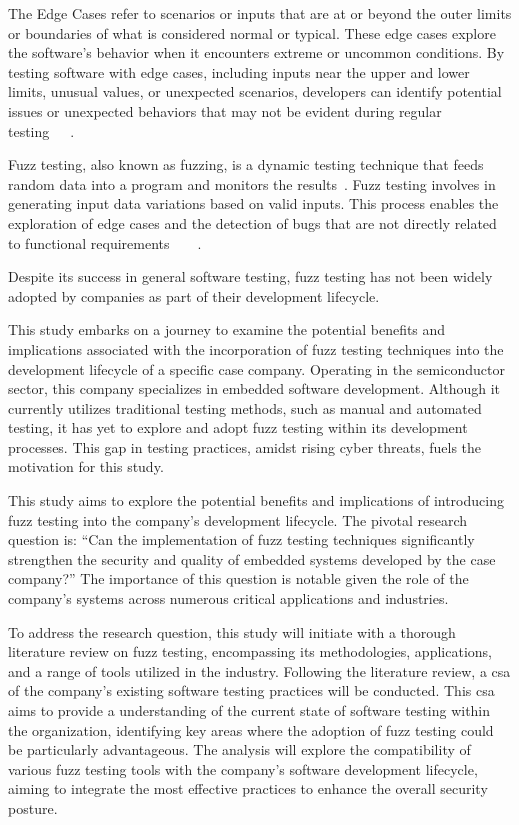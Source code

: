 The \gls{Edge Cases} refer to scenarios or inputs that are at or beyond the outer limits or boundaries
of what is considered normal or typical. These edge cases explore the software's behavior when
it encounters extreme or uncommon conditions. By testing software with edge cases, including
inputs near the upper and lower limits, unusual values, or unexpected scenarios, developers
can identify potential issues or unexpected behaviors that may not be evident
during regular testing~\cite{deng2023large}~\cite{cunningham2019software}~\cite{koopman2016challenges}.

Fuzz testing, also known as fuzzing, is a dynamic testing technique that feeds random data into a
program and monitors the results~\cite{felderer2016security}\cite{yun2022fuzzing}.
Fuzz testing involves in generating input data variations based on valid inputs.
This process enables the exploration of edge cases and the detection of bugs that are not directly
related to
functional requirements~\cite{eisele2022debugger}~\cite{fowler2018fuzz}~\cite{deng2023large}~\cite{eisele2022embedded}.

Despite its success in general software testing, fuzz testing has not been widely adopted by
companies as part of their development lifecycle\cite{liang2018fuzz}.

This study embarks on a journey to examine the potential benefits and implications
associated with the incorporation of fuzz testing techniques into the development
lifecycle of a specific case company. Operating in the semiconductor sector,
this company specializes in embedded software development. Although it currently
utilizes traditional testing methods, such as manual and automated testing, it
has yet to explore and adopt fuzz testing within its development processes.
This gap in testing practices, amidst rising cyber threats, fuels the motivation
for this study.

This study aims to explore the potential benefits and implications of introducing
fuzz testing into the company's development lifecycle. The pivotal research
question is: ``Can the implementation of fuzz testing techniques significantly
strengthen the security and quality of embedded systems developed by the case
company?'' The importance of this question is notable given the
role of the company's systems across numerous critical applications and industries.

To address the research question, this study will initiate with a thorough
literature review on fuzz testing, encompassing its methodologies, applications,
and a range of tools utilized in the industry. Following the literature review,
a \gls{csa} of the company's existing software
testing practices will be conducted. This \acrshort{csa} aims to provide a
understanding of the current state of software testing within the
organization, identifying key areas where the adoption of fuzz testing could be
particularly advantageous. The analysis will explore the compatibility of
various fuzz testing tools with the company's software development lifecycle,
aiming to integrate the most effective practices to enhance the overall security
posture.

